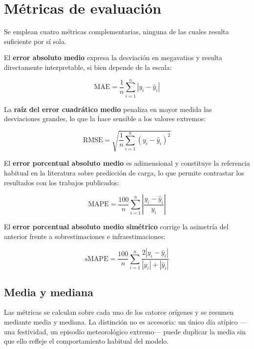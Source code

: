 \section{Métricas de evaluación}

Se emplean cuatro métricas complementarias, ninguna de las cuales resulta
suficiente por sí sola.

El \textbf{error absoluto medio} expresa la desviación en megavatios y resulta
directamente interpretable, si bien depende de la escala:

\begin{equation}
\text{MAE} = \frac{1}{n}\sum_{i=1}^{n}\left|y_i - \hat{y}_i\right|
\end{equation}

La \textbf{raíz del error cuadrático medio} penaliza en mayor medida las
desviaciones grandes, lo que la hace sensible a los valores extremos:

\begin{equation}
\text{RMSE} = \sqrt{\frac{1}{n}\sum_{i=1}^{n}\left(y_i - \hat{y}_i\right)^2}
\end{equation}

El \textbf{error porcentual absoluto medio} es adimensional y constituye la
referencia habitual en la literatura sobre predicción de carga, lo que permite
contrastar los resultados con los trabajos publicados:

\begin{equation}
\text{MAPE} = \frac{100}{n}\sum_{i=1}^{n}\left|\frac{y_i - \hat{y}_i}{y_i}\right|
\end{equation}

El \textbf{error porcentual absoluto medio simétrico} corrige la asimetría del
anterior frente a sobrestimaciones e infraestimaciones:

\begin{equation}
\text{sMAPE} = \frac{100}{n}\sum_{i=1}^{n}
  \frac{2\left|y_i - \hat{y}_i\right|}{\left|y_i\right| + \left|\hat{y}_i\right|}
\end{equation}

\subsection*{Media y mediana}

Las métricas se calculan sobre cada uno de los catorce orígenes y se resumen
mediante media y mediana. La distinción no es accesoria: un único día atípico
—una festividad, un episodio meteorológico extremo— puede duplicar la media sin
que ello refleje el comportamiento habitual del modelo.

